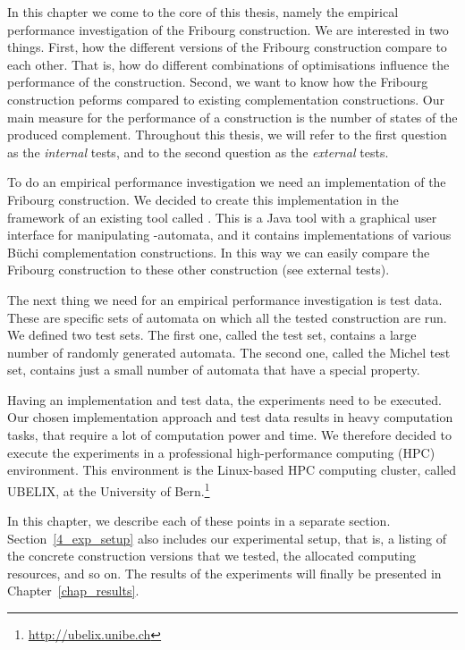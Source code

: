 In this chapter we come to the core of this thesis, namely the empirical performance investigation of the Fribourg construction. We are interested in two things. First, how the different versions of the Fribourg construction compare to each other. That is, how do different combinations of optimisations influence the performance of the construction. Second, we want to know how the Fribourg construction peforms compared to existing complementation constructions. Our main measure for the performance of a construction is the number of states of the produced complement. Throughout this thesis, we will refer to the first question as the \textit{internal} tests, and to the second question as the \textit{external} tests.

To do an empirical performance investigation we need an implementation of the Fribourg construction. We decided to create this implementation in the framework of an existing tool called \goal. This is a Java tool with a graphical user interface for manipulating \om-automata, and it contains implementations of various Büchi complementation constructions. In this way we can easily compare the Fribourg construction to these other construction (see external tests).

The next thing we need for an empirical performance investigation is test data. These are specific sets of automata on which all the tested construction are run. We defined two test sets. The first one, called the \goal{} test set, contains a large number of randomly generated automata. The second one, called the Michel test set, contains just a small number of automata that have a special property.

Having an implementation and test data, the experiments need to be executed. Our chosen implementation approach and test data results in heavy computation tasks, that require a lot of computation power and time. We therefore decided to execute the experiments in a professional high-performance computing (HPC) environment. This environment is the Linux-based HPC computing cluster, called UBELIX, at the University of Bern.\footnote{\url{http://ubelix.unibe.ch}}

In this chapter, we describe each of these points in a separate section. Section~\ref{4_exp_setup} also includes our experimental setup, that is, a listing of the concrete construction versions that we tested, the allocated computing resources, and so on. The results of the experiments will finally be presented in Chapter~\ref{chap_results}.


